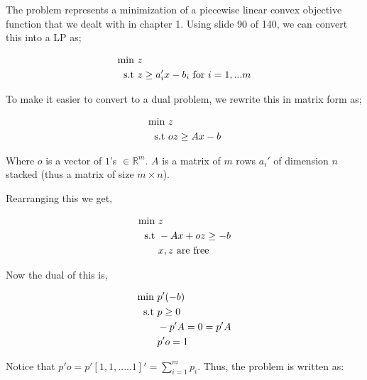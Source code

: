 


The problem represents a minimization of a piecewise linear convex objective function that we dealt with in chapter 1. Using slide 90 of 140, we can convert this into a LP as;

\begin{align}
    \text{min } &z \notag\\
    \text{s.t }  &z \ge a_i'x - b_i \text{ for } i=1,...m\notag
\end{align}

To make it easier to convert to a dual problem, we rewrite this in matrix form as;

\begin{align}
    \text{min } &z \notag\\
    \text{s.t }  &oz \ge Ax - b \notag
\end{align}

Where $o$ is a vector of $1$'s $\in \mathbb{R}^m$. $A$ is a matrix of $m$ rows $a_i'$ of dimension $n$ stacked (thus a matrix of size $m \times n$).

Rearranging this we get,

\begin{align}
    \text{min } &z \notag\\
    \text{s.t }  &-Ax + oz \ge -b  \notag\\
                &x, z \text{ are free }\notag
\end{align}

Now the dual of this is, 

\begin{align}
    \text{min } &p'(-b) \notag\\
    \text{s.t }  &p \ge 0  \notag\\
                &-p'A = 0 = p'A \notag\\
                &p'o = 1 \notag
\end{align}

Notice that $p'o = p' [1, 1, .....1]' = \sum_{i=1}^{m} p_i$. Thus, the problem is written as:

